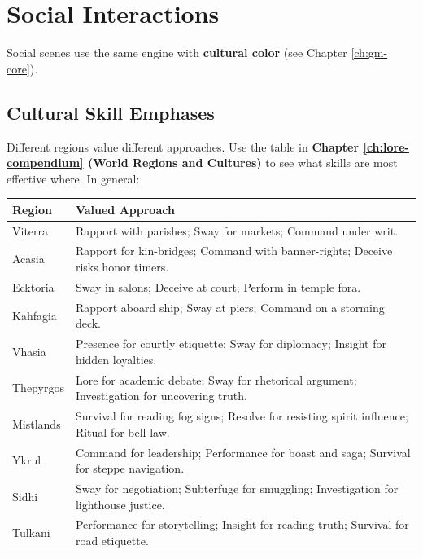 \section{Social Interactions}
\label{sec:social-interactions}
Social scenes use the same engine with \textbf{cultural color} (see Chapter \ref{ch:gm-core}).

\subsection*{Cultural Skill Emphases}
\label{sec:cultural-skills}
Different regions value different approaches. Use the table in \textbf{Chapter \ref{ch:lore-compendium} (World Regions and Cultures)} to see what skills are most effective where. In general:

\begin{center}
\begin{longtable}{ll}
\toprule
\textbf{Region} & \textbf{Valued Approach} \\
\midrule
Viterra & Rapport with parishes; Sway for markets; Command under writ. \\
Acasia & Rapport for kin-bridges; Command with banner-rights; Deceive risks honor timers. \\
Ecktoria & Sway in salons; Deceive at court; Perform in temple fora. \\
Kahfagia & Rapport aboard ship; Sway at piers; Command on a storming deck. \\
Vhasia & Presence for courtly etiquette; Sway for diplomacy; Insight for hidden loyalties. \\
Thepyrgos & Lore for academic debate; Sway for rhetorical argument; Investigation for uncovering truth. \\
Mistlands & Survival for reading fog signs; Resolve for resisting spirit influence; Ritual for bell-law. \\
Ykrul & Command for leadership; Performance for boast and saga; Survival for steppe navigation. \\
Sidhi & Sway for negotiation; Subterfuge for smuggling; Investigation for lighthouse justice. \\
Tulkani & Performance for storytelling; Insight for reading truth; Survival for road etiquette. \\
\bottomrule
\end{longtable}
\end{center}

